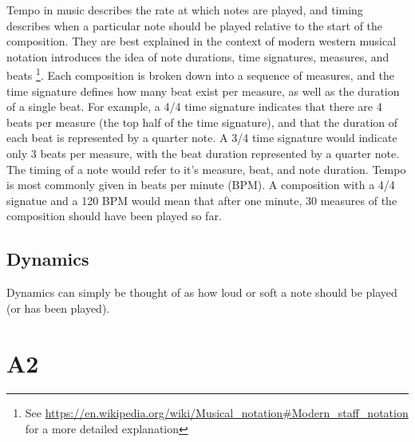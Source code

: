\begin{appendices}
Tempo in music describes the rate at which notes are played, and timing describes when a particular note should be played relative to the start of the composition. They are best explained in the context of modern western musical notation introduces the idea of note durations, time signatures, measures, and beats \footnote{See \url{https://en.wikipedia.org/wiki/Musical_notation\#Modern_staff_notation} for a more detailed explanation}.  Each composition is broken down into a sequence of measures, and the time signature defines how many beat exist per measure, as well as the duration of a single beat. For example, a 4/4 time signature indicates that there are 4 beats per measure (the top half of the time signature), and that the duration of each beat is represented by a quarter note. A 3/4 time signature would indicate only 3 beats per measure, with the beat duration represented by a quarter note. The timing of a note would refer to it's measure, beat, and note duration. Tempo is most commonly given in beats per minute (BPM). A composition with a 4/4 signatue and a 120 BPM would mean that after one minute, 30 measures of the composition should have been played so far. 

\subsection{Dynamics}

Dynamics can simply be thought of as how loud or soft a note should be played (or has been played). 

\section{A2} \label{ase:app_one_sect_2}
\end{appendices}
